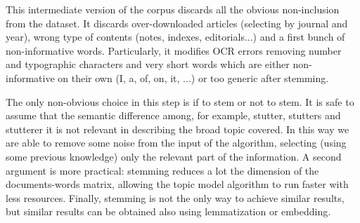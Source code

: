 \documentclass[a4paper, 11pt, headings=standardclasses, tablecaptionsbelow]{scrartcl}
\begin{document}
This intermediate version of the corpus discards all the obvious non-inclusion from the dataset. It discards over-downloaded articles (selecting by journal and year), wrong type of contents (notes, indexes, editorials...) and a first bunch of non-informative words. Particularly, it modifies OCR errors removing number and typographic characters and very short words which are either non-informative on their own (I, a, of, on, it, ...) or too generic after stemming.

The only non-obvious choice in this step is if to stem or not to stem. It is safe to assume that the semantic difference among, for example, stutter, stutters and stutterer it is not relevant in describing the broad topic covered. In this way we are able to remove some noise from the input of the algorithm, selecting (using some previous knowledge) only the relevant part of the information. A second argument is more practical: stemming reduces a lot the dimension of the documents-words matrix, allowing the topic model algorithm to run faster with less resources.
Finally, stemming is not the only way to achieve similar results, but similar results can be obtained also using lemmatization or embedding.
\end{document}

